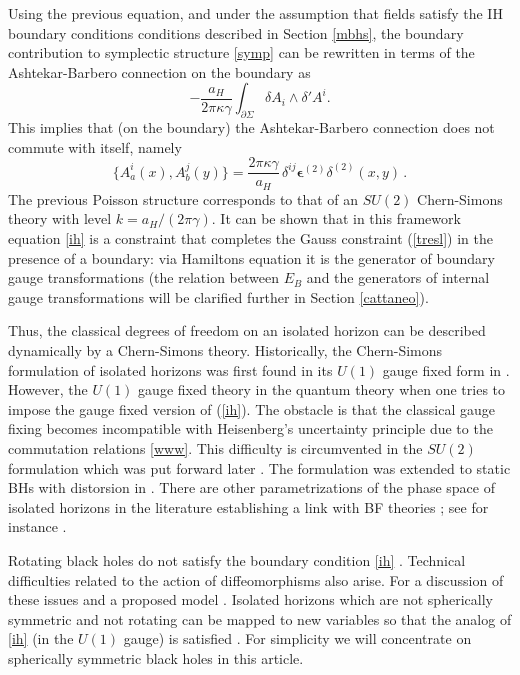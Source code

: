\documentclass[aps, nofootinbib,superscriptaddress,12pt]{revtex4-2}
\newcommand{\va}{\scriptscriptstyle}
\def\be{\begin{equation}}
\def\ee{\end{equation}}
\begin{document}
Using the previous equation,  and under the assumption that fields satisfy the IH boundary conditions conditions described in Section \ref{mbhs}, the boundary contribution to symplectic structure \eqref{symp} can be rewritten in terms of the Ashtekar-Barbero connection on the boundary
as
\be 
-\frac{a_{H}}{2\pi \kappa \gamma}\int_{\partial \Sigma} \delta A_i\wedge \delta' A^i.
\ee
This implies that (on the boundary) the Ashtekar-Barbero connection does not commute with itself, namely
\be
\{A^i_a(x), A^j_b(y)\}= \frac{2\pi \kappa \gamma}{a_{H}}\, \delta^{ij} \boldsymbol{\epsilon}^{\va (2)}\delta^{\va (2)}(x, y)\,.
\ee 
The previous Poisson structure corresponds to that of an $SU(2)$ Chern-Simons theory 
with level $k=a_{H}/(2\pi \gamma)$.  It can be shown  that in this framework
equation \eqref{ih} is a constraint that completes the Gauss constraint (\ref{tresl}) in the presence of a boundary: via Hamiltons equation 
it is the generator of boundary gauge transformations \cite{Engle:2010kt} (the relation between $E_B$ and the generators of internal gauge transformations will be clarified further in Section \ref{cattaneo}). 

Thus, the classical degrees of freedom on an isolated horizon can be described dynamically by a Chern-Simons theory. Historically, the Chern-Simons formulation of isolated horizons was first found in its $U(1)$ gauge fixed form in \cite{Ashtekar:1997yu, Ashtekar:2000eq}. However, the $U(1)$ gauge fixed theory in the quantum theory when one tries to impose  the gauge fixed version of (\ref{ih}).  The  obstacle is that the classical gauge fixing becomes incompatible with Heisenberg's uncertainty principle due to the commutation relations \eqref{www}. This difficulty is circumvented in the $SU(2)$ formulation which was put forward later \cite{Engle:2009vc, Engle:2010kt}.  The formulation was extended to static BHs with distorsion in \cite{Perez:2010pq}. There are other parametrizations of the phase space of isolated horizons in the literature establishing a link with BF theories \cite{Celada:2016jdt}; see for instance \cite{Pranzetti:2014tla, Wang:2014oua}.

Rotating black holes do not satisfy the boundary condition \eqref{ih} \cite{Roken:2013mqa}. Technical difficulties related to the action of diffeomorphisms also arise. For a discussion of these issues and a proposed model \cite{Frodden:2012en}.  Isolated horizons which are not spherically symmetric and not rotating can be mapped to new variables so that the analog of \eqref{ih} (in the $U(1)$ gauge) is satisfied \cite{Ashtekar:2004nd, Beetle:2010rd}. For simplicity we will concentrate on spherically symmetric black holes in this article.
\end{document}
